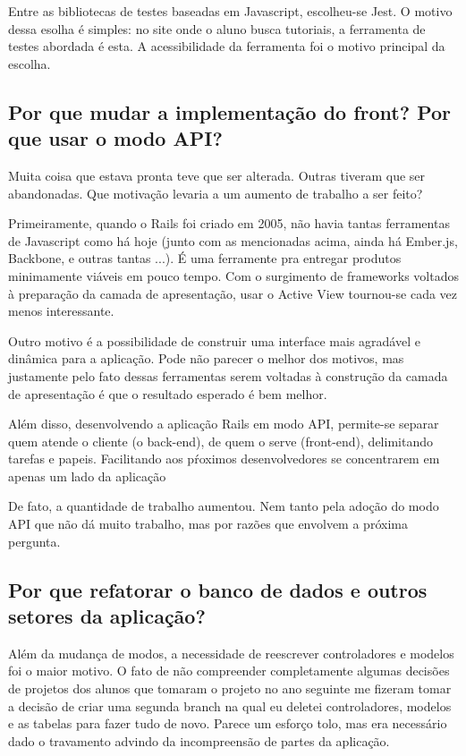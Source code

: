 Entre as bibliotecas de testes baseadas em Javascript, escolheu-se Jest. O motivo dessa esolha é simples:
no site onde o aluno busca tutoriais, a ferramenta de testes abordada é esta. A acessibilidade da ferramenta
foi o motivo principal da escolha.

\subsection{Por que mudar a implementação do front? Por que usar o modo API?}

Muita coisa que estava pronta teve que ser alterada. Outras tiveram que ser abandonadas. Que motivação levaria
a um aumento de trabalho a ser feito?

Primeiramente, quando o Rails foi criado em 2005, não havia tantas ferramentas de Javascript como há hoje
(junto com as mencionadas acima, ainda há Ember.js, Backbone, e outras tantas ...). É uma ferramente pra
entregar produtos minimamente viáveis em pouco tempo. Com o surgimento de frameworks voltados à preparação
da camada de apresentação, usar o Active View tournou-se cada vez menos interessante.

Outro motivo é a possibilidade de construir uma interface mais agradável e dinâmica para a aplicação. Pode não
parecer o melhor dos motivos, mas justamente pelo fato dessas ferramentas  serem voltadas à construção
da camada de apresentação é que o resultado esperado é bem melhor.

Além disso, desenvolvendo a aplicação Rails em modo API, permite-se separar quem atende o cliente (o back-end),
de quem o serve (front-end), delimitando tarefas e papeis. Facilitando aos pŕoximos desenvolvedores se concentrarem
em apenas um lado da aplicação

De fato, a quantidade de trabalho aumentou. Nem tanto pela adoção do modo API que não dá muito trabalho, mas por
razões que envolvem a próxima pergunta.

\subsection{Por que refatorar o banco de dados e outros setores da aplicação?}
\label{subsec:refatorar}

Além da mudança de modos, a necessidade de reescrever controladores e modelos foi o maior motivo. O fato de não
compreender completamente algumas decisões de projetos dos alunos que tomaram o projeto no ano seguinte me fizeram
tomar a decisão de criar uma segunda branch na qual eu deletei controladores, modelos e as tabelas para fazer tudo
de novo. Parece um esforço tolo, mas era necessário dado o travamento advindo da incompreensão de partes da aplicação.

